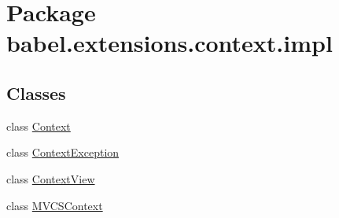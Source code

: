 \hypertarget{namespacebabel_1_1extensions_1_1context_1_1impl}{\section{Package babel.\-extensions.\-context.\-impl}
\label{namespacebabel_1_1extensions_1_1context_1_1impl}
}
\subsection*{Classes}
\begin{DoxyCompactItemize}
\item 
class \hyperlink{classbabel_1_1extensions_1_1context_1_1impl_1_1_context}{Context}
\item 
class \hyperlink{classbabel_1_1extensions_1_1context_1_1impl_1_1_context_exception}{Context\-Exception}
\item 
class \hyperlink{classbabel_1_1extensions_1_1context_1_1impl_1_1_context_view}{Context\-View}
\item 
class \hyperlink{classbabel_1_1extensions_1_1context_1_1impl_1_1_m_v_c_s_context}{M\-V\-C\-S\-Context}
\end{DoxyCompactItemize}
